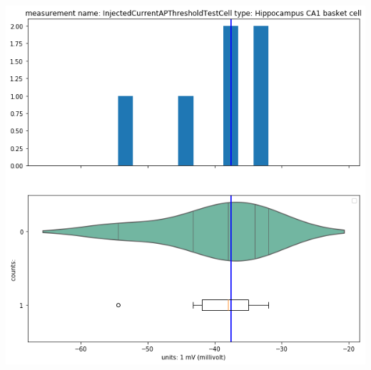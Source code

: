     
\begin{center}
   \includegraphics[width=0.7\linewidth]{notebooks_converted/needata_thesis_files/needata_thesis_5_10}
\end{center}




    


    
